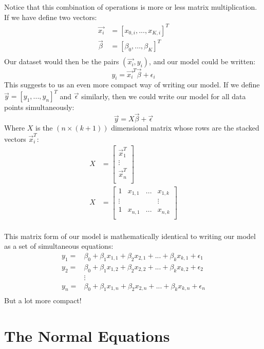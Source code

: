 \documentclass[
]{article}
\begin{document}
Notice that this combination of operations is more or less matrix
multiplication. If we have define two vectors: \[
\begin{split}
\vec{x_i} &= [x_{0,i},...,x_{K,i}]^T\\
\vec{\beta} &= [\beta_0,...,\beta_{K}]^T\\
\end{split}
\] Our dataset would then be the pairs \((\vec{x_i},y_i)\), and our
model could be written: \[
y_i = \vec{x_i}^T \vec{\beta} + \epsilon_i 
\] This suggests to us an even more compact way of writing our model. If
we define \(\vec{y} = [y_1,...,y_n]^T\) and \(\vec{\epsilon}\)
similarly, then we could write our model for all data points
simultaneously: \[
\vec{y} = X \vec{\beta} + \vec{\epsilon}
\] Where \(X\) is the \((n \times (k+1))\) dimensional matrix whose rows
are the stacked vectors \(\vec{x}_i^T\): \[
\begin{split}
X &= \left[
\begin{array}{c}
\vec{x}^T_1\\
\vdots\\
\vec{x}^T_n\\
\end{array}
\right]\\
X &= \left[
\begin{array}{cccc}
1 & x_{1,1} & ... & x_{1,k}\\ 
\vdots & & & \vdots \\
1 & x_{n,1} & ... & x_{n,k}\\ 
\end{array}
\right]\\
\end{split}
\]

This matrix form of our model is mathematically identical to writing our
model as a set of simultaneous equations: \[
\begin{split}
y_1 =& \beta_0  + \beta_1 x_{1,1} + \beta_2 x_{2,1} + ... + \beta_k x_{k,1} + \epsilon_1\\
y_2 =& \beta_0  + \beta_1 x_{1,2} + \beta_2 x_{2,2} + ... + \beta_k x_{k,2} + \epsilon_2\\
 & \vdots \\
y_n =& \beta_0  + \beta_1 x_{1,n} + \beta_2 x_{2,n} + ... + \beta_k x_{k,n} + \epsilon_n\\
\end{split}
\] But a lot more compact!

\hypertarget{the-normal-equations}{%
\section{The Normal Equations}\label{the-normal-equations}}
\end{document}
